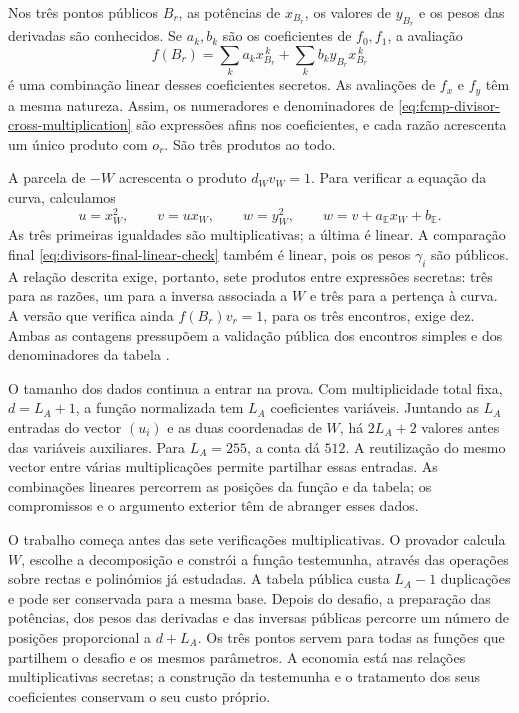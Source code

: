 Nos três pontos públicos \(B_r\), as potências de \(x_{B_r}\),
os valores de \(y_{B_r}\) e os pesos das derivadas são conhecidos.
Se \(a_k,b_k\) são os coeficientes de \(f_0,f_1\), a avaliação
\[
 f(B_r)=\sum_k a_k x_{B_r}^{\,k}
       +\sum_k b_k y_{B_r}x_{B_r}^{\,k}
\]
é uma combinação linear desses coeficientes secretos.
As avaliações de \(f_x\) e \(f_y\) têm a mesma natureza.
Assim, os numeradores e denominadores de
\eqref{eq:fcmp-divisor-cross-multiplication} são expressões afins
nos coeficientes, e cada razão acrescenta um único produto com
\(o_r\). São três produtos ao todo.

A parcela de \(-W\) acrescenta o produto \(d_Wv_W=1\).
Para verificar a equação da curva, calculamos
\[
 u=x_W^2,\qquad v=ux_W,\qquad w=y_W^2,
 \qquad w=v+a_{\mathbb E}x_W+b_{\mathbb E}.
\]
As três primeiras igualdades são multiplicativas; a última é linear.
A comparação final \eqref{eq:divisors-final-linear-check} também
é linear, pois os pesos \(\gamma_i\) são públicos. A relação
descrita exige, portanto, sete produtos entre expressões secretas:
três para as razões, um para a inversa associada a \(W\) e três
para a pertença à curva. A versão que verifica ainda
\(f(B_r)v_r=1\), para os três encontros, exige dez. Ambas as
contagens pressupõem a validação pública dos encontros simples e
dos denominadores da tabela \cite{monero-oxide-fcmp-source}.

O tamanho dos dados continua a entrar na prova. Com multiplicidade
total fixa, \(d=L_A+1\), a função normalizada tem \(L_A\)
coeficientes variáveis. Juntando as \(L_A\) entradas do vector
\((u_i)\) e as duas coordenadas de \(W\), há
\(2L_A+2\) valores antes das variáveis auxiliares. Para
\(L_A=255\), a conta dá \(512\). A reutilização do mesmo vector
entre várias multiplicações permite partilhar essas entradas.
As combinações lineares percorrem as posições da função e da tabela;
os compromissos e o argumento exterior têm de abranger esses dados.

O trabalho começa antes das sete verificações multiplicativas.
O provador calcula \(W\), escolhe a decomposição e constrói a
função testemunha, através das operações sobre rectas e polinómios
já estudadas. A tabela pública custa \(L_A-1\) duplicações e
pode ser conservada para a mesma base. Depois do desafio, a preparação
das potências, dos pesos das derivadas e das inversas públicas percorre
um número de posições proporcional a \(d+L_A\). Os três pontos
servem para todas as funções que partilhem o desafio e os mesmos
parâmetros. A economia está nas relações multiplicativas secretas;
a construção da testemunha e o tratamento dos seus coeficientes
conservam o seu custo próprio.

